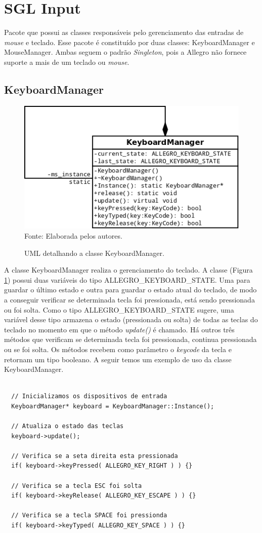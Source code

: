 \section{SGL Input}
%
%
Pacote que possui as classes responsáveis pelo gerenciamento das entradas de \textit{mouse} e teclado. Esse pacote é constituído por duas classes: KeyboardManager e MouseManager. Ambas seguem o padrão \textit{Singleton}, pois a Allegro não fornece suporte a mais de um teclado ou \textit{mouse}.
%
%
\subsection{KeyboardManager}
%
%
%
\begin{figure}[h]
    \centering
    \caption{UML detalhando a classe KeyboardManager.}
    \label{KeyboardManager}
    \includegraphics[scale = 0.4]{uml/KeyboardManager.png}
    \\Fonte: Elaborada pelos autores.
\end{figure}
%
%
\par
A classe KeyboardManager realiza o gerenciamento do teclado. A classe (Figura \ref{KeyboardManager}) possui duas variáveis do tipo ALLEGRO\_KEYBOARD\_STATE. Uma para guardar o último estado e outra para guardar o estado atual do teclado, de modo a conseguir verificar se determinada tecla foi pressionada, está sendo pressionada ou foi solta. Como o tipo ALLEGRO\_KEYBOARD\_STATE sugere, uma variável desse tipo armazena o estado (pressionada ou solta) de todas as teclas do teclado no momento em que o método \textit{update()} é chamado. Há outros três métodos que verificam se determinada tecla foi pressionada, continua pressionada ou se foi solta. Os métodos recebem como parâmetro o \textit{keycode} da tecla e retornam um tipo booleano. A seguir temos um exemplo de uso da classe KeyboardManager.
%
%
\begin{lstlisting}

  // Inicializamos os dispositivos de entrada
  KeyboardManager* keyboard = KeyboardManager::Instance();
  
  // Atualiza o estado das teclas
  keyboard->update();
	
  // Verifica se a seta direita esta pressionada
  if( keyboard->keyPressed( ALLEGRO_KEY_RIGHT ) ) {}
  
  // Verifica se a tecla ESC foi solta
  if( keyboard->keyRelease( ALLEGRO_KEY_ESCAPE ) ) {}
  
  // Verifica se a tecla SPACE foi pressionda
  if( keyboard->keyTyped( ALLEGRO_KEY_SPACE ) ) {}
	      
\end{lstlisting}
%
